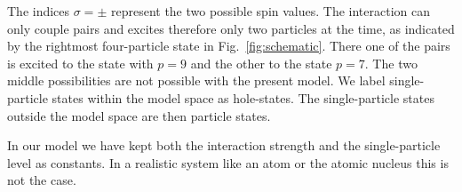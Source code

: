 \documentclass[prc]{revtex4} \usepackage[dvips]{graphicx}
\begin{document}
The indices
$\sigma=\pm$ represent the two possible spin values. The interaction
can only couple pairs and excites therefore only two particles at the
time, as indicated by the rightmost four-particle state in
Fig.~\ref{fig:schematic}. There one of the pairs is excited to the
state with $p=9$ and the other to the state $p=7$. The two middle
possibilities are not possible with the present model.  We label
single-particle states within the model space as hole-states. The
single-particle states outside the model space are then particle
states. 

In our model we have kept both the interaction strength and the
single-particle level as constants.  In a realistic system like an
atom or the atomic nucleus this is not the case.
\end{document}
